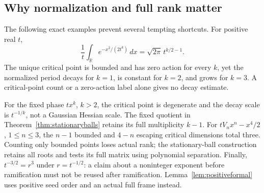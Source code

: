\subsection{Why normalization and full rank matter}

The following exact examples prevent several tempting shortcuts.
For positive real $t$,
\[
 \frac1t\int_{\mathbb R}e^{-x^2/(2t^k)}\,dx
   =\sqrt{2\pi}\,t^{k/2-1}.
\]
The unique critical point is bounded and has zero action for every
$k$, yet the normalized period decays for $k=1$, is constant for
$k=2$, and grows for $k=3$. A critical-point count or a zero-action
label alone gives no decay estimate.

For the fixed phase $tx^k$, $k>2$, the critical point is degenerate
and the decay scale is $t^{-1/k}$, not a Gaussian Hessian scale.
The fixed quotient in Theorem~\ref{thm:stationaryballs}
retains its full multiplicity $k-1$.
For $tV_nx^n-x^4/2$, $1\leq n\leq3$, the $n-1$ bounded and
$4-n$ escaping critical dimensions total three. Counting only
bounded points loses actual rank; the stationary-ball construction
retains all roots and tests its full matrix using polynomial separation.
Finally, $t^{-3/2}=r^3$ under $r=t^{-1/2}$: a claim about a
noninteger exponent before ramification must not be reused after
ramification. Lemma~\ref{lem:positiveformal} uses positive seed order
and an actual full frame instead.

